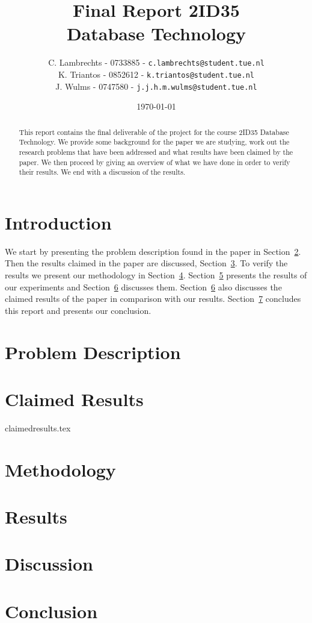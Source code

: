 \documentclass[a4paper,twoside,11pt]{article}
\title{\vspace{-\baselineskip}\sffamily\bfseries Final Report 2ID35 \\ Database Technology }
\author{
C. Lambrechts - 0733885 - {\tt c.lambrechts@student.tue.nl} \\
K. Triantos - 0852612 - {\tt k.triantos@student.tue.nl}\\
J. Wulms - 0747580 - {\tt j.j.h.m.wulms@student.tue.nl}\\
}
\date{\today}
\numberwithin{equation}{section}
\begin{document}
\maketitle
\thispagestyle{empty}
\begin{abstract}
This report contains the final deliverable of the project for the course 2ID35 Database Technology. We provide some background for the paper we are studying, work out the research problems that have been addressed and what results have been claimed by the paper. We then proceed by giving an overview of what we have done in order to verify their results. We end with a discussion of the results.
\end{abstract}

\section{Introduction} \label{sec:Introduction}

We start by presenting the problem description found in the paper in Section~\ref{sec:ProblemDescription}. Then the results claimed in the paper are discussed, Section~\ref{sec:ClaimedResults}. To verify the results we present our methodology in Section~\ref{sec:Methodology}. Section~\ref{sec:Results} presents the results of our experiments and Section~\ref{sec:Discussion} discusses them. Section~\ref{sec:Discussion} also discusses the claimed results of the paper \cite{paper} in comparison with our results. Section~\ref{sec:Conclusion} concludes this report and presents our conclusion. 

\section{Problem Description} \label{sec:ProblemDescription}


\section{Claimed Results} \label{sec:ClaimedResults}
 {claimedresults.tex}

\section{Methodology} \label{sec:Methodology}


\section{Results} \label{sec:Results}


\section{Discussion} \label{sec:Discussion}


\section{Conclusion} \label{sec:Conclusion}

%


\end{document}
